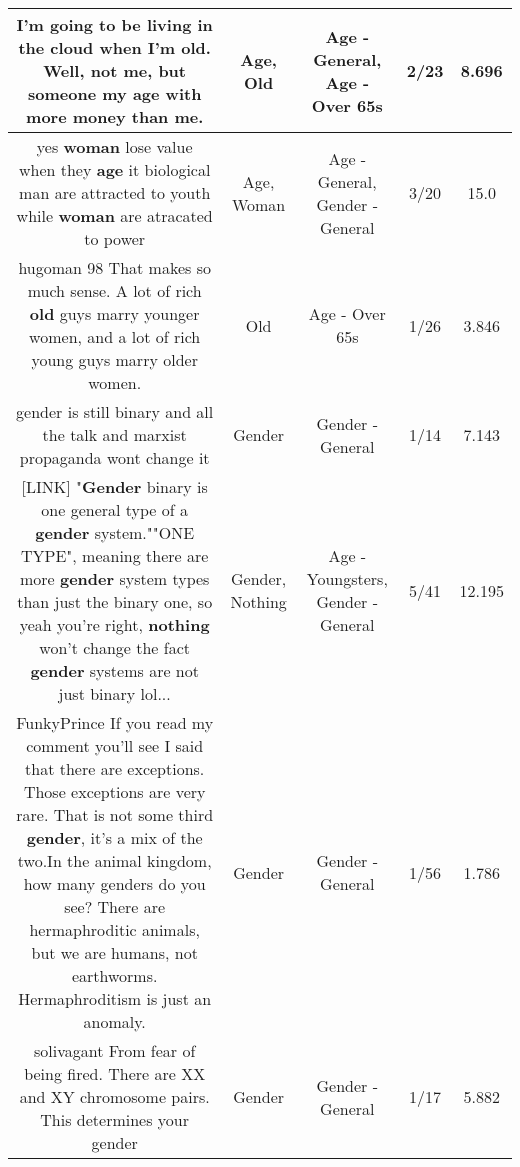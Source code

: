 \documentclass[11pt]{article}
\newlength\mylength
\begin{document}
\begin{center}
\begin{longtable}{|C{.65\mylength}|C{.30\mylength}|C{.12\mylength}|C{.12\mylength}|C{.12\mylength}|}
  \small I'm going to be living in the cloud when I'm \textbf{old}. Well, not me, but someone my \textbf{age} with more money than me.\normalsize   & Age, Old & Age - General, Age - Over 65s & 2/23 & 8.696 \\  \hline
  \small yes \textbf{woman} lose value when they \textbf{age} it biological man are attracted to youth while \textbf{woman} are atracated to power\normalsize   & Age, Woman & Age - General, Gender - General & 3/20 & 15.0 \\  \hline
  \small hugoman 98 That makes so much sense. A lot of rich \textbf{old} guys marry younger women, and a lot of rich young guys marry older women.\normalsize   & Old & Age - Over 65s & 1/26 & 3.846 \\  \hline
  \small gender is still binary and all the talk and marxist propaganda wont change it\normalsize   & Gender & Gender - General & 1/14 & 7.143 \\  \hline
  \small  [LINK] "\textbf{Gender} binary is one general type of a \textbf{gender} system.""ONE TYPE", meaning there are more \textbf{gender} system types than just the binary one, so yeah you're right, \textbf{nothing} won't change the fact \textbf{gender} systems are not just binary lol...\normalsize   & Gender, Nothing & Age - Youngsters, Gender - General & 5/41 & 12.195 \\  \hline
  \small FunkyPrince If you read my comment you'll see I said that there are exceptions. Those exceptions are very rare. That is not some third \textbf{gender}, it's a mix of the two.In the animal kingdom, how many genders do you see? There are hermaphroditic animals, but we are humans, not earthworms. Hermaphroditism is just an anomaly.\normalsize   & Gender & Gender - General & 1/56 & 1.786 \\  \hline
  \small solivagant From fear of being fired. There are XX and XY chromosome pairs. This determines your gender\normalsize   & Gender & Gender - General & 1/17 & 5.882 \\  \hline

\end{longtable}
\end{center}
\end{document}
